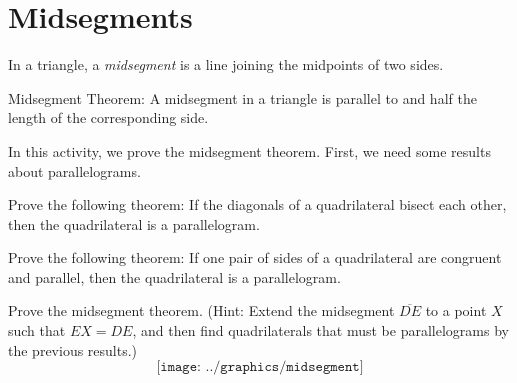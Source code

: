 \newpage

\section{Midsegments}
\begin{definition}
In a triangle, a \emph{midsegment} is a line joining the midpoints of two sides.  
\end{definition}

\begin{theorem}
Midsegment Theorem:  A midsegment in a triangle is parallel to and half the length of the corresponding side.
\end{theorem}

In this activity, we prove the midsegment theorem.  First, we need some results about parallelograms. 

\begin{prob}
Prove the following theorem:  If the diagonals of a quadrilateral bisect each other, then the quadrilateral is a parallelogram. 
\end{prob}

\begin{prob}
Prove the following theorem:  If one pair of sides of a quadrilateral are congruent and parallel, then the quadrilateral is a parallelogram. 
\end{prob}

\begin{prob}
Prove the midsegment theorem.  (Hint:  Extend the midsegment $\overline{DE}$ to a point $X$ such that $EX=DE$, and then find quadrilaterals that must be parallelograms by the previous results.)  
$$\texttt{[image: ../graphics/midsegment]}$$
\end{prob}




